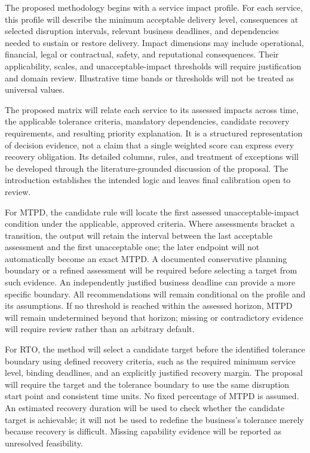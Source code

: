 The proposed methodology begins with a service impact profile. For each service, this profile will describe the minimum acceptable delivery level, consequences at selected disruption intervals, relevant business deadlines, and dependencies needed to sustain or restore delivery. Impact dimensions may include operational, financial, legal or contractual, safety, and reputational consequences. Their applicability, scales, and unacceptable-impact thresholds will require justification and domain review. Illustrative time bands or thresholds will not be treated as universal values.

The proposed matrix will relate each service to its assessed impacts across time, the applicable tolerance criteria, mandatory dependencies, candidate recovery requirements, and resulting priority explanation. It is a structured representation of decision evidence, not a claim that a single weighted score can express every recovery obligation. Its detailed columns, rules, and treatment of exceptions will be developed through the literature-grounded discussion of the proposal. The introduction establishes the intended logic and leaves final calibration open to review.

For MTPD, the candidate rule will locate the first assessed unacceptable-impact condition under the applicable, approved criteria. Where assessments bracket a transition, the output will retain the interval between the last acceptable assessment and the first unacceptable one; the later endpoint will not automatically become an exact MTPD. A documented conservative planning boundary or a refined assessment will be required before selecting a target from such evidence. An independently justified business deadline can provide a more specific boundary. All recommendations will remain conditional on the profile and its assumptions. If no threshold is reached within the assessed horizon, MTPD will remain undetermined beyond that horizon; missing or contradictory evidence will require review rather than an arbitrary default.

For RTO, the method will select a candidate target before the identified tolerance boundary using defined recovery criteria, such as the required minimum service level, binding deadlines, and an explicitly justified recovery margin. The proposal will require the target and the tolerance boundary to use the same disruption start point and consistent time units. No fixed percentage of MTPD is assumed. An estimated recovery duration will be used to check whether the candidate target is achievable; it will not be used to redefine the business's tolerance merely because recovery is difficult. Missing capability evidence will be reported as unresolved feasibility.

